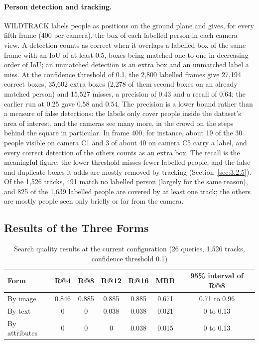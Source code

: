 \paragraph{Person detection and tracking.} WILDTRACK labels people as positions on the ground plane and gives, for every fifth frame (400 per camera), the box of each labelled person in each camera view. A detection counts as correct when it overlaps a labelled box of the same frame with an IoU of at least 0.5, boxes being matched one to one in decreasing order of IoU; an unmatched detection is an extra box and an unmatched label a miss. At the confidence threshold of 0.1, the 2,800 labelled frames give 27,194 correct boxes, 35,602 extra boxes (2,278 of them second boxes on an already matched person) and 15,527 misses, a precision of 0.43 and a recall of 0.64; the earlier run at 0.25 gave 0.58 and 0.54. The precision is a lower bound rather than a measure of false detections: the labels only cover people inside the dataset's area of interest, and the cameras see many more, in the crowd on the steps behind the square in particular. In frame 400, for instance, about 19 of the 30 people visible on camera C1 and 3 of about 40 on camera C5 carry a label, and every correct detection of the others counts as an extra box. The recall is the meaningful figure: the lower threshold misses fewer labelled people, and the false and duplicate boxes it adds are mostly removed by tracking (Section~\ref{sec:3.2.5}). Of the 1,526 tracks, 491 match no labelled person (largely for the same reason), and 825 of the 1,639 labelled people are covered by at least one track; the others are mostly people seen only briefly or far from the camera.

\subsection{Results of the Three Forms}

\begin{table}[H]
\centering
\caption{Search quality results at the current configuration (26 queries, 1,526 tracks, confidence threshold 0.1)}
\label{tab:recall}
\begin{tabularx}{\textwidth}{|L|c|c|c|c|c|c|}
\hline
\textbf{Form} & \textbf{R@4} & \textbf{R@8} & \textbf{R@12} & \textbf{R@16} & \textbf{MRR} & \textbf{95\% interval of R@8} \\
\hline
By image & 0.846 & 0.885 & 0.885 & 0.885 & 0.671 & 0.71 to 0.96 \\
\hline
By text & 0 & 0 & 0.038 & 0.038 & 0.021 & 0 to 0.13 \\
\hline
By attributes & 0 & 0 & 0 & 0.038 & 0.015 & 0 to 0.13 \\
\hline
\end{tabularx}
\end{table}

